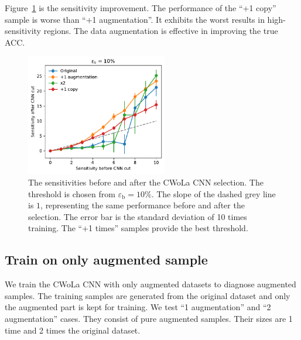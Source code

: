 \documentclass[12pt]{article}
\begin{document}
			Figure~\ref{fig:sensitivity_improvement_bkg_eff_01_copy_1} is the sensitivity improvement. The performance of the ``+1 copy'' sample is worse than ``+1 augmentation''. It exhibits the worst results in high-sensitivity regions. The data augmentation is effective in improving the true ACC.
			\begin{figure}[htpb]
				\centering
				\includegraphics[width=0.55\textwidth]{HVmodel_sensitivity_improvement_bkg_eff_10_copy_1.pdf}
				\caption{The sensitivities before and after the CWoLa CNN selection. The threshold is chosen from $\varepsilon_{\text{b}} = 10\%$. The slope of the dashed grey line is $1$, representing the same performance before and after the selection. The error bar is the standard deviation of 10 times training. The ``+1 times'' samples provide the best threshold.}
				\label{fig:sensitivity_improvement_bkg_eff_01_copy_1}
			\end{figure}
	\subsection{Train on only augmented sample}%
	\label{sub:train_on_only_augmented_sample}
		We train the CWoLa CNN with only augmented datasets to diagnose augmented samples. The training samples are generated from the original dataset and only the augmented part is kept for training. We test ``1 augmentation'' and ``2 augmentation'' cases. They consist of pure augmented samples. Their sizes are 1 time and 2 times the original dataset.
\end{document}
